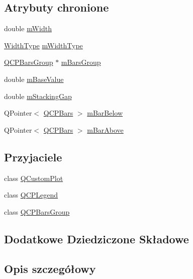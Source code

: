 \subsection*{Atrybuty chronione}
\begin{DoxyCompactItemize}
\item 
double \hyperlink{class_q_c_p_bars_a7c4e0f2246f8133f48a9c3f24cf5b920}{m\+Width}
\item 
\hyperlink{class_q_c_p_bars_a65dbbf1ab41cbe993d71521096ed4649}{Width\+Type} \hyperlink{class_q_c_p_bars_a94dba1309496c7601d01e2c59715cbb3}{m\+Width\+Type}
\item 
\hyperlink{class_q_c_p_bars_group}{Q\+C\+P\+Bars\+Group} $\ast$ \hyperlink{class_q_c_p_bars_a9f59c255f3739182ca9744dff75beaa9}{m\+Bars\+Group}
\item 
double \hyperlink{class_q_c_p_bars_aa0515cf47fa6044cc28e59b1ae5ec759}{m\+Base\+Value}
\item 
double \hyperlink{class_q_c_p_bars_a2022ddbcf8b464a05d434700a666da18}{m\+Stacking\+Gap}
\item 
Q\+Pointer$<$ \hyperlink{class_q_c_p_bars}{Q\+C\+P\+Bars} $>$ \hyperlink{class_q_c_p_bars_ad51db970eed7e286f2753b0216fc56de}{m\+Bar\+Below}
\item 
Q\+Pointer$<$ \hyperlink{class_q_c_p_bars}{Q\+C\+P\+Bars} $>$ \hyperlink{class_q_c_p_bars_a0c1c46076c41a478dbb373cfd35929aa}{m\+Bar\+Above}
\end{DoxyCompactItemize}
\subsection*{Przyjaciele}
\begin{DoxyCompactItemize}
\item 
class \hyperlink{class_q_c_p_bars_a1cdf9df76adcfae45261690aa0ca2198}{Q\+Custom\+Plot}
\item 
class \hyperlink{class_q_c_p_bars_a8429035e7adfbd7f05805a6530ad5e3b}{Q\+C\+P\+Legend}
\item 
class \hyperlink{class_q_c_p_bars_ae1051b4d58a2786cb420367a586e2fee}{Q\+C\+P\+Bars\+Group}
\end{DoxyCompactItemize}
\subsection*{Dodatkowe Dziedziczone Składowe}


\subsection{Opis szczegółowy}


